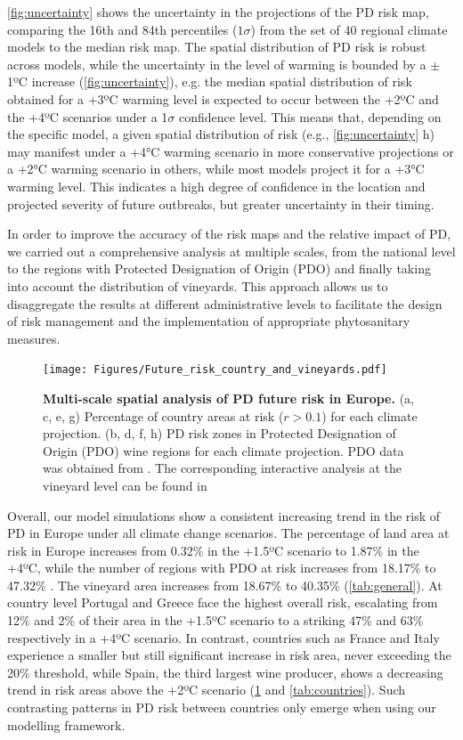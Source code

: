 \cref{fig:uncertainty} shows the uncertainty in the projections of the PD
risk map, comparing the 16th and 84th percentiles ($1\sigma$) from the set of
40 regional climate models to the median risk map. The spatial distribution of
PD risk is robust across models, while the uncertainty in the level of warming
is bounded by a $\pm$ 1ºC increase (\cref{fig:uncertainty}), e.g. the median
spatial distribution of risk obtained for a +3ºC warming level is expected to
occur between the +2ºC and the +4ºC scenarios under a 1$\sigma$ confidence
level. This means that, depending on the specific model, a given spatial
distribution of risk (e.g., \cref{fig:uncertainty} h) may manifest under a +4°C
warming scenario in more conservative projections or a +2°C warming scenario in
others, while most models project it for a +3°C warming level. This indicates a
high degree of confidence in the location and projected severity of future
outbreaks, but greater uncertainty in their timing.

In order to improve the accuracy of the risk maps and the  relative impact
of PD, we carried out a comprehensive analysis at multiple scales, from the
national level to the regions with Protected Designation of Origin (PDO) and
finally taking into account the distribution of vineyards. This approach allows
us to disaggregate the results at different administrative levels to facilitate
the design of risk management and the implementation of appropriate
phytosanitary measures.

\begin{figure}[H]
    \centering

    \texttt{[image: Figures/Future\_risk\_country\_and\_vineyards.pdf]}
    \caption{\textbf{Multi-scale spatial analysis of PD future risk in
            Europe.} (a, c, e, g) Percentage of country areas at risk ($r>0.1$)
        for each
        climate projection. (b, d, f, h) PD risk zones in Protected Designation
        of
        Origin (PDO) wine regions for each climate projection. PDO data was
        obtained
        from \cite{Candiago2022}. The corresponding interactive analysis at the
        vineyard level can be found in \cite{Webpage}}
    \label{fig:vineyards}
\end{figure}

Overall, our model simulations show a consistent
increasing trend in the risk of PD in Europe under all climate change
scenarios. The percentage of land area at risk in Europe increases from 0.32\%
in the +1.5ºC scenario to 1.87\% in the +4ºC, while the number of regions with
PDO at risk increases from 18.17\% to 47.32\% . The vineyard area  increases
from 18.67\% to 40.35\% (\cref{tab:general}). At country level
Portugal and
Greece face the highest overall risk, escalating from 12\% and 2\% of their
area  in the +1.5ºC scenario to a striking 47\% and 63\%  respectively in a
+4ºC scenario. In contrast, countries such as France and Italy experience a
smaller but still significant increase in risk area, never exceeding the 20\%
threshold, while Spain, the third largest wine producer, shows a decreasing
trend in risk areas above the +2ºC scenario (\cref{fig:vineyards} and
\cref{tab:countries}). Such contrasting patterns in PD risk between
countries
only emerge when using our modelling framework.

